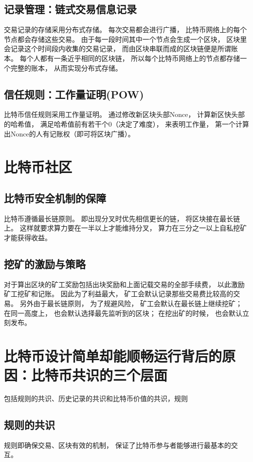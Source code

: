 \documentclass[UTF8,12pt]{article}
\begin{document}
    \subsection{记录管理：链式交易信息记录}
    交易记录的存储采用分布式存储。
    每次交易都会进行广播，
    比特币网络上的每个节点都会存储这些交易。
    由于每一段时间其中一个节点会生成一个区块，
    区块里会记录这个时间段内收集的交易记录，
    而由区块串联而成的区块链便是所谓账本。
    每个人都有一条近乎相同的区块链，
    所以每个比特币网络上的节点都存储一个完整的账本，
    从而实现分布式存储。
    \subsection{信任规则：工作量证明(POW)}
    比特币信任规则采用工作量证明。
    通过修改新区块头部Nonce，
    计算新区快头部的哈希值，
    满足哈希值前有若干个0（决定了难度），
    来表明工作量，
    第一个计算出Nonce的人有记账权（即可将区块广播）。
    \section{比特币社区}
    \subsection{比特币安全机制的保障}
    比特币遵循最长链原则。
    即出现分叉时优先相信更长的链，
    将区块接在最长链上。
    这样就要求算力要在一半以上才能维持分叉，
    算力在三分之一以上自私挖矿才能获得收益。
    \subsection{挖矿的激励与策略}
    对于算出区块的矿工奖励包括出块奖励和上面记载交易的全部手续费，
    以此激励矿工挖矿和记账。
    因此为了利益最大，
    矿工会默认记录那些交易费比较高的交易。
    另外由于最长链原则，
    为了规避风险，
    矿工会默认在最长链上继续挖矿；
    在同一高度上，
    也会默认选择最先监听到的区块；
    在挖出矿的时候，
    也会默认立刻发布。
    \section{比特币设计简单却能顺畅运行背后的原因：比特币共识的三个层面}
    包括规则的共识、历史记录的共识和比特币价值的共识，规则
    \subsection{规则的共识}
    规则即确保交易、区块有效的机制，
    保证了比特币参与者能够进行最基本的交互。
\end{document}

